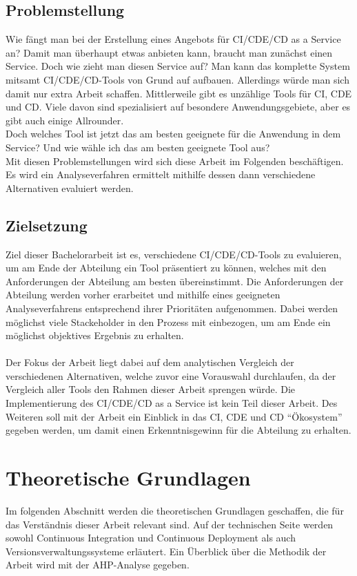 \section{Problemstellung} 
Wie fängt man bei der Erstellung eines Angebots für \ac{CI}/\ac{CDE}/\ac{CD} as a Service an? Damit man überhaupt etwas anbieten kann, braucht man zunächst einen Service. Doch wie zieht man diesen Service auf? Man kann das komplette System mitsamt \ac{CI}/\ac{CDE}/\ac{CD}-Tools von Grund auf aufbauen. Allerdings würde man sich damit nur extra Arbeit schaffen. Mittlerweile gibt es unzählige Tools für \ac{CI}, \ac{CDE} und \ac{CD}. Viele davon sind spezialisiert auf besondere Anwendungsgebiete, aber es gibt auch einige Allrounder.\\ Doch welches Tool ist jetzt das am besten geeignete für die Anwendung in dem Service? Und wie wähle ich das am besten geeignete Tool aus?\\
Mit diesen Problemstellungen wird sich diese Arbeit im Folgenden beschäftigen. Es wird ein Analyseverfahren ermittelt mithilfe dessen dann verschiedene Alternativen evaluiert werden.
\section{Zielsetzung} 
Ziel dieser Bachelorarbeit ist es, verschiedene \ac{CI}/\ac{CDE}/\ac{CD}-Tools zu evaluieren, um am Ende der Abteilung ein Tool präsentiert zu können, welches mit den Anforderungen der Abteilung am besten übereinstimmt. Die Anforderungen der Abteilung werden vorher erarbeitet und mithilfe eines geeigneten Analyseverfahrens entsprechend ihrer Prioritäten aufgenommen. Dabei werden möglichst viele Stackeholder in den Prozess mit einbezogen, um am Ende ein möglichst objektives Ergebnis zu erhalten.\\
\\
Der Fokus der Arbeit liegt dabei auf dem analytischen Vergleich der verschiedenen Alternativen, welche zuvor eine Vorauswahl durchlaufen, da der Vergleich aller Tools den Rahmen dieser Arbeit sprengen würde. Die Implementierung des \ac{CI}/\ac{CDE}/\ac{CD} as a Service ist kein Teil dieser Arbeit. Des Weiteren  soll mit der Arbeit ein Einblick in das \ac{CI}, \ac{CDE} und \ac{CD} \enquote{Ökosystem} gegeben werden, um damit einen Erkenntnisgewinn für die Abteilung zu erhalten.
\chapter{Theoretische Grundlagen} 
Im folgenden Abschnitt werden die theoretischen Grundlagen geschaffen, die für das Verständnis dieser Arbeit relevant sind. Auf der technischen Seite werden sowohl Continuous Integration und Continuous Deployment als auch Versionsverwaltungssysteme erläutert. Ein Überblick über die Methodik der Arbeit wird mit der AHP-Analyse gegeben.
